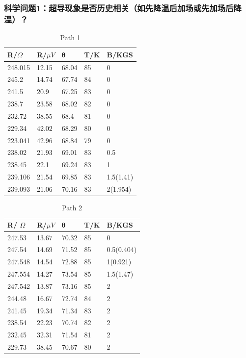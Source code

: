 \documentclass{ctexart}                                     %
\theoremstyle{ansstyle}
\begin{document}
\subsubsection{科学问题1：超导现象是否历史相关（如先降温后加场或先加场后降温）？}
\begin{table}[H]
    \centering
    \begin{tabular}{@{}lllll@{}}
        \toprule
        R/$ \Omega $ & R/$\mu V$ & θ     & T/K & B/KGS     \\ \midrule
        248.015      & 12.15     & 68.04 & 85  & 0         \\
        245.2        & 14.74     & 67.74 & 84  & 0         \\
        241.5        & 20.9      & 67.25 & 83  & 0         \\
        238.7        & 23.58     & 68.02 & 82  & 0         \\
        232.72       & 38.55     & 68.4  & 81  & 0         \\
        229.34       & 42.02     & 68.29 & 80  & 0         \\
        223.041      & 42.96     & 68.84 & 79  & 0         \\
        238.02       & 21.93     & 69.01 & 83  & 0.5       \\
        238.45       & 22.1      & 69.24 & 83  & 1         \\
        239.106      & 21.54     & 69.85 & 83  & 1.5(1.41) \\
        239.093      & 21.06     & 70.16 & 83  & 2(1.954)  \\ \bottomrule
    \end{tabular}
    \caption {Path 1 }
\end{table}
\begin{table}[H]
    \centering
    \begin{tabular}{@{}lllll@{}}

        \toprule
        R/ $ \Omega $ & R/$\mu V$ & θ     & T/K & B/KGS      \\ \midrule
        247.53        & 13.67     & 70.32 & 85  & 0          \\
        247.54        & 14.69     & 71.52 & 85  & 0.5(0.404) \\
        247.548       & 14.54     & 72.88 & 85  & 1(0.921)   \\
        247.554       & 14.27     & 73.54 & 85  & 1.5(1.47)  \\
        247.542       & 13.87     & 73.16 & 85  & 2          \\
        244.48        & 16.67     & 72.74 & 84  & 2          \\
        241.45        & 19.34     & 71.34 & 83  & 2          \\
        238.54        & 22.23     & 70.74 & 82  & 2          \\
        232.45        & 32.31     & 71.54 & 81  & 2          \\
        229.73        & 38.45     & 70.67 & 80  & 2          \\ \bottomrule
    \end{tabular}
    \caption{Path 2}
\end{table}
\end{document}
